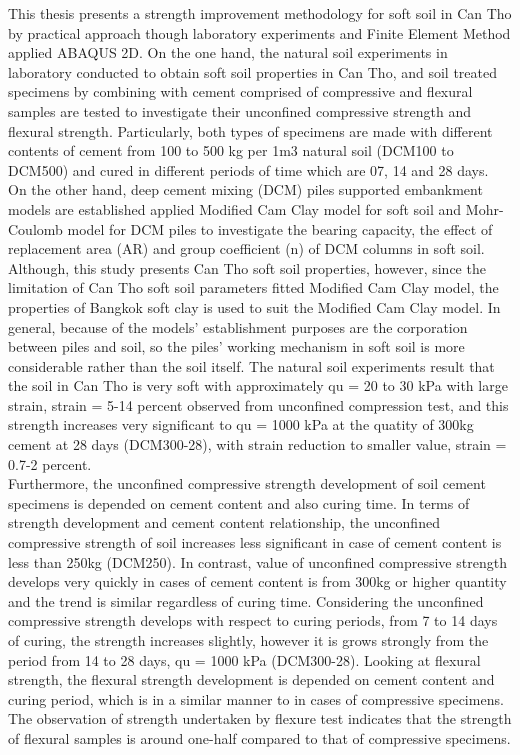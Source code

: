 This thesis presents a strength improvement methodology for soft soil in Can Tho by
practical approach though laboratory experiments and Finite Element Method applied
ABAQUS 2D. On the one hand, the natural soil experiments in laboratory conducted to
obtain soft soil properties in Can Tho, and soil treated specimens by combining with
cement comprised of compressive and flexural samples are tested to investigate their
unconfined compressive strength and flexural strength. Particularly, both types of
specimens are made with different contents of cement from 100 to 500 kg per 1m3
natural soil (DCM100 to DCM500) and cured in different periods of time which are 07,
14 and 28 days. \\ [10pt]
On the other hand, deep cement mixing (DCM) piles supported embankment models are
established applied Modified Cam Clay model for soft soil and Mohr-Coulomb model
for DCM piles to investigate the bearing capacity, the effect of replacement area (AR)
and group coefficient (n) of DCM columns in soft soil. Although, this study presents
Can Tho soft soil properties, however, since the limitation of Can Tho soft soil
parameters fitted Modified Cam Clay model, the properties of Bangkok soft clay is used
to suit the Modified Cam Clay model. In general, because of the models’ establishment
purposes are the corporation between piles and soil, so the piles’ working mechanism in
soft soil is more considerable rather than the soil itself.
The natural soil experiments result that the soil in Can Tho is very soft with
approximately qu = 20 to 30 kPa with large strain,  strain = 5-14 percent observed from unconfined
compression test, and this strength increases very significant to qu = 1000 kPa at the
quatity of 300kg cement at 28 days (DCM300-28), with strain reduction to smaller
value,  strain = 0.7-2 percent. \\ [10pt]

Furthermore, the unconfined compressive strength development of soil cement
specimens is depended on cement content and also curing time. In terms of strength
development and cement content relationship, the unconfined compressive strength of
soil increases less significant in case of cement content is less than 250kg (DCM250).
In contrast, value of unconfined compressive strength develops very quickly in cases of cement content is from 300kg or higher quantity and the trend is similar regardless of
curing time. Considering the unconfined compressive strength develops with respect to
curing periods, from 7 to 14 days of curing, the strength increases slightly, however it
is grows strongly from the period from 14 to 28 days, qu = 1000 kPa (DCM300-28).
Looking at flexural strength, the flexural strength development is depended on cement
content and curing period, which is in a similar manner to in cases of compressive
specimens. The observation of strength undertaken by flexure test indicates that the
strength of flexural samples is around one-half compared to that of compressive
specimens. \\ [10pt]

